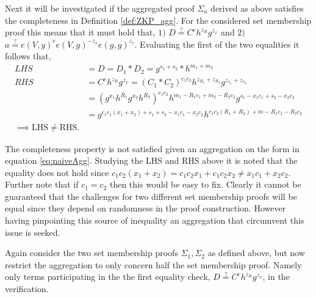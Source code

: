 
Next it will be investigated if the aggregated proof $\Sigma_a$ derived as above satisfies the completeness in Definition \ref{def:ZKP_agg}. For the considered set membership proof this means that it must hold that, $1)$ $D \overset{?}{=} C^ch^{z_R}g^{z_x}$ and $2)$ $ a \overset{?}{=} e(V,y)^ce(V,g)^{-z_x}e(g,g)^{z_\tau}$. Evaluating the first of the two equalities it follows that,
\begin{align*}
LHS &= D = D_1*D_2 = g^{s_1+s_2}*h^{m_1+m_2} \\
RHS &= C^ch^{z_R}g^{z_x} = (C_1*C_2)^{c_1c_2}h^{z_{R_1}+z_{R_2}}g^{z_{x_1}+z_{x_2}} \\ 
&=(g^{x_1}h^{R_1}g^{x_2}h^{R_2}) ^{c_1c_2}  h^{m_1-R_1c_1+m_2-R_2c_2} g^{s_1- x_1c_1+s_2-x_2c_2} \\
&= g^{c_1c_1(x_1+x_2)+s_1+s_2-x_1c_1-x_2c_2}h^{c_1c_2(R_1+R_2)+m-R_1c_1-R_2c_2} \\
\implies \text{LHS}\neq \text{RHS}.
\end{align*}

The completeness property is not satisfied given an aggregation on the form in equation \eqref{eq:naiveAgg}. Studying the LHS and RHS above it is noted that the equality does not hold since  $ c_1c_2(x_1+x_2) = c_1c_2x_1+c_1c_2x_2 \neq x_1c_1 + x_2c_2$. Further note that if $c_1=c_2$ then this would be easy to fix. Clearly it cannot be guaranteed that the challenges for two different set membership proofs will be equal since they depend on randomness in the proof construction. However having pinpointing this source of inequality an aggregation that circumvent this issue is seeked.

Again consider the two set membership proofs $\Sigma_1,\Sigma_2$ as defined above, but now restrict the aggregation to only concern half the set membership proof. Namely only terms participating in the the first equality check, $D\overset{?}{=} C^ch^{z_R}g^{z_x}$, in the verification. 


